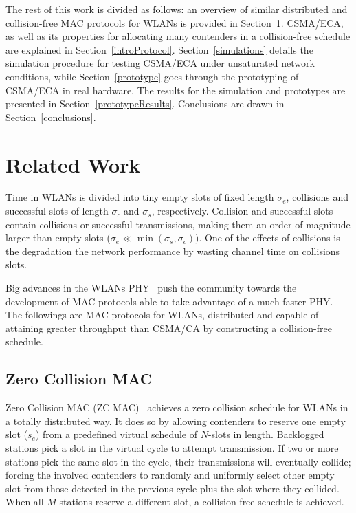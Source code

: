 \documentclass[a4paper,journal]{IEEEtran}
\begin{document}
The rest of this work is divided as follows: an overview of similar distributed and collision-free MAC protocols for WLANs is provided in  Section~\ref{relatedWork}. CSMA/ECA, as well as its properties for allocating many contenders in a collision-free schedule are explained in Section~\ref{introProtocol}. Section~\ref{simulations} details the simulation procedure for testing CSMA/ECA under unsaturated network conditions, while Section~\ref{prototype} goes through the prototyping of CSMA/ECA in real hardware. The results for the simulation and prototypes are presented in Section~\ref{prototypeResults}. Conclusions are drawn in Section~\ref{conclusions}.



\section{Related Work}\label{relatedWork}
Time in WLANs is divided into tiny empty slots of fixed length $\sigma_{e}$, collisions and successful slots of length $\sigma_{c}$ and $\sigma_{s}$, respectively. Collision and successful slots contain collisions or successful transmissions, making them an order of magnitude larger than empty slots ($\sigma_{e}\ll\min(\sigma_{s},\sigma_{c}))$. One of the effects of collisions is the degradation the network performance by wasting channel time on collisions slots. 

Big advances in the WLANs PHY~\cite{perahia2008ieee,6191306} push the community towards the development of MAC protocols able to take advantage of a much faster PHY. The followings are MAC protocols for WLANs, distributed and capable of attaining greater throughput than CSMA/CA by constructing a collision-free schedule.

\subsection{Zero Collision MAC} 

Zero Collision MAC (ZC MAC)~\cite{ZMAC} achieves a zero collision schedule for WLANs in a totally distributed way. It does so by allowing contenders to reserve one empty slot ($s_{e}$) from a  predefined virtual schedule of $N$-slots in length. Backlogged stations pick a slot in the virtual cycle to attempt transmission. If two or more stations pick the same slot in the cycle, their transmissions will eventually collide; forcing the involved contenders to randomly and uniformly select other empty slot from those detected in the previous cycle plus the slot where they collided. When all $M$ stations reserve a different slot, a collision-free schedule is achieved.
\end{document}
